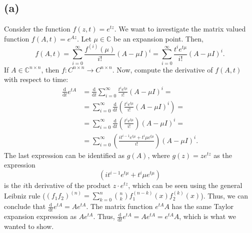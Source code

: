 \subsection*{(a)}


Consider the function $f(z,t) = e^{tz}$. We want to investigate the matrix valued function $f(A,t) = e^{Az}$. Let $\mu \in \mathbb{C}$ be an expansion point. Then,
\begin{equation}
  f(A,t) = \sum\limits_{i = 0}^{\infty} \frac{f^{(i)}(\mu)}{i!}(A-\mu I)^{i} = \sum\limits_{i = 0}^{\infty} \frac{t^ie^{t\mu}}{i!}(A-\mu I)^{i}.
\end{equation}
If $A\in\mathbb{C}^{n\times n}$, then $f:C^{n \times n}\rightarrow C^{n \times n}$. Now, compute the derivative of $f(A,t)$ with respect to time:
\begin{equation}
\begin{aligned}
\frac{\mathrm d}{\mathrm d t}e^{tA} & = \frac{\mathrm d}{\mathrm dt}\sum^{\infty}_{i = 0} \frac{t^ie^{t\mu}}{i!}(A-\mu I )^i = \\
& = \sum^{\infty}_{i = 0} \frac{\mathrm d}{\mathrm dt}\left(\frac{t^ie^{t\mu}}{i!}(A-\mu I )^i\right) = \\
& = \sum^{\infty}_{i = 0} \frac{\mathrm d}{\mathrm dt}\left(\frac{t^ie^{t\mu}}{i!}\right)(A-\mu I )^i  = \\
&= \sum^{\infty}_{i = 0}  \left(\frac{it^{i-1}e^{t\mu}+t^i\mu e^{t\mu}}{i!}\right) (A-\mu I )^i.
\end{aligned}
\end{equation}
The last expression can be identified as $g(A)$, where $g(z) = ze^{tz}$ as  the expression
\begin{equation}
\left(it^{i-1}e^{t\mu}+t^i\mu e^{t\mu}\right)
\end{equation}
is the $i$th derivative of the product $z\cdot e^{tz}$, which can be seen using the general Leibniz rule ($(f_1f_2)^{(n)} = \sum_{k = 0}^n\binom{n}{k}f_1^{(n-k)}(x)f_2^{(k)}(x)$). Thus, we can conclude that $\frac{\mathrm d }{\mathrm dt}e^{tA} = Ae^{tA}$. The matrix function $e^{tA}A$ has the same Taylor expansion expression as $Ae^{tA}$. Thus, $\frac{\mathrm d }{\mathrm dt}e^{tA} = Ae^{tA} = e^{tA} A$, which is what we wanted to show.


